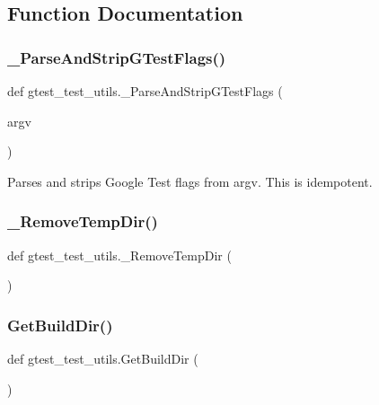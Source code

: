 \subsection{Function Documentation}
\mbox{\label{namespacegtest__test__utils_a05ad62af6574fd7e4fa2cc7c952c4f0b}} 
\subsubsection{\texorpdfstring{\_ParseAndStripGTestFlags()}{\_ParseAndStripGTestFlags()}}
{\footnotesize\ttfamily def gtest\+\_\+test\+\_\+utils.\+\_\+\+Parse\+And\+Strip\+G\+Test\+Flags (\begin{DoxyParamCaption}\item[{}]{argv }\end{DoxyParamCaption})\hspace{0.3cm}{\ttfamily [private]}}

\begin{DoxyVerb}Parses and strips Google Test flags from argv.  This is idempotent.\end{DoxyVerb}
 \mbox{\label{namespacegtest__test__utils_a2fcd62f625111800ee67e0afe46b2c75}} 
\subsubsection{\texorpdfstring{\_RemoveTempDir()}{\_RemoveTempDir()}}
{\footnotesize\ttfamily def gtest\+\_\+test\+\_\+utils.\+\_\+\+Remove\+Temp\+Dir (\begin{DoxyParamCaption}{ }\end{DoxyParamCaption})\hspace{0.3cm}{\ttfamily [private]}}

\mbox{\label{namespacegtest__test__utils_a1eacd9a471dfa6133028923ea755d22c}} 
\subsubsection{\texorpdfstring{GetBuildDir()}{GetBuildDir()}}
{\footnotesize\ttfamily def gtest\+\_\+test\+\_\+utils.\+Get\+Build\+Dir (\begin{DoxyParamCaption}{ }\end{DoxyParamCaption})}

